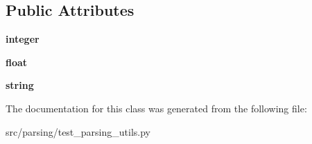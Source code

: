 \subsection*{\-Public \-Attributes}
\begin{DoxyCompactItemize}
\item 
\hypertarget{classparsing_1_1test__parsing__utils_1_1_format_type_test_case_a903d38911e6159be0333b7e3192aac5d}{{\bfseries integer}}\label{classparsing_1_1test__parsing__utils_1_1_format_type_test_case_a903d38911e6159be0333b7e3192aac5d}

\item 
\hypertarget{classparsing_1_1test__parsing__utils_1_1_format_type_test_case_aad8fdaa99129b5e6894ef0120b88bc58}{{\bfseries float}}\label{classparsing_1_1test__parsing__utils_1_1_format_type_test_case_aad8fdaa99129b5e6894ef0120b88bc58}

\item 
\hypertarget{classparsing_1_1test__parsing__utils_1_1_format_type_test_case_a4f30c494d8bef9ac850319ee2b8f0ade}{{\bfseries string}}\label{classparsing_1_1test__parsing__utils_1_1_format_type_test_case_a4f30c494d8bef9ac850319ee2b8f0ade}

\end{DoxyCompactItemize}


\-The documentation for this class was generated from the following file\-:\begin{DoxyCompactItemize}
\item 
src/parsing/test\-\_\-parsing\-\_\-utils.\-py\end{DoxyCompactItemize}
